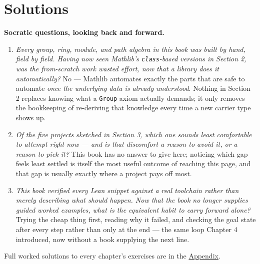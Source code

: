 \section{Solutions}\label{sec:13-next-steps:04-solutions:1}

\textbf{Socratic questions, looking back and forward.}

\begin{enumerate}
\def\labelenumi{\arabic{enumi}.}
\tightlist
\item
  \emph{Every group, ring, module, and path algebra in this book was built by hand, field by field. Having now seen Mathlib's \texttt{class}-based versions in Section 2, was the from-scratch work wasted effort, now that a library does it automatically?} No --- Mathlib automates exactly the parts that are safe to automate \emph{once the underlying data is already understood}. Nothing in Section 2 replaces knowing what a \texttt{Group} axiom actually demands; it only removes the bookkeeping of re-deriving that knowledge every time a new carrier type shows up.
\item
  \emph{Of the five projects sketched in Section 3, which one sounds least comfortable to attempt right now --- and is that discomfort a reason to avoid it, or a reason to pick it?} This book has no answer to give here; noticing which gap feels least settled is itself the most useful outcome of reaching this page, and that gap is usually exactly where a project pays off most.
\item
  \emph{This book verified every Lean snippet against a real toolchain rather than merely describing what should happen. Now that the book no longer supplies guided worked examples, what is the equivalent habit to carry forward alone?} Trying the cheap thing first, reading why it failed, and checking the goal state after every step rather than only at the end --- the same loop Chapter 4 introduced, now without a book supplying the next line.
\end{enumerate}

Full worked solutions to every chapter's exercises are in the \hyperref[sec:14-appendix-solutions:00-index:1]{Appendix}.
